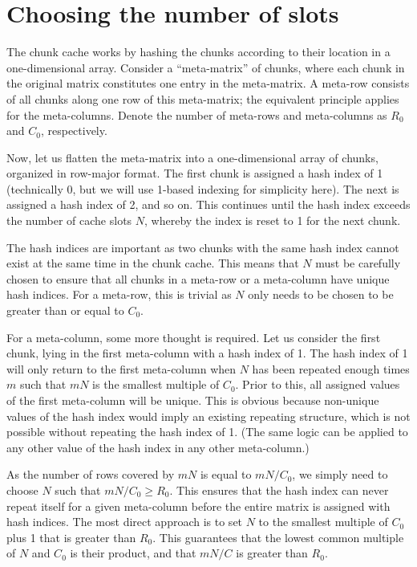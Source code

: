 \documentclass{article}
\begin{document}
\section*{Choosing the number of slots}
The chunk cache works by hashing the chunks according to their location in a one-dimensional array.
Consider a ``meta-matrix'' of chunks, where each chunk in the original matrix constitutes one entry in the meta-matrix.
A meta-row consists of all chunks along one row of this meta-matrix; the equivalent principle applies for the meta-columns.
Denote the number of meta-rows and meta-columns as $R_0$ and $C_0$, respectively.

Now, let us flatten the meta-matrix into a one-dimensional array of chunks, organized in row-major format.
The first chunk is assigned a hash index of 1 (technically 0, but we will use 1-based indexing for simplicity here).
The next is assigned a hash index of 2, and so on.
This continues until the hash index exceeds the number of cache slots $N$,  whereby the index is reset to 1 for the next chunk.

The hash indices are important as two chunks with the same hash index cannot exist at the same time in the chunk cache.
This means that $N$ must be carefully chosen to ensure that all chunks in a meta-row or a meta-column have unique hash indices.
For a meta-row, this is trivial as $N$ only needs to be chosen to be greater than or equal to $C_0$.

For a meta-column, some more thought is required.
Let us consider the first chunk, lying in the first meta-column with a hash index of 1.
The hash index of 1 will only return to the first meta-column when $N$ has been repeated enough times $m$ such that $mN$ is the smallest multiple of $C_0$.
Prior to this, all assigned values of the first meta-column will be unique.
This is obvious because non-unique values of the hash index would imply an existing repeating structure, which is not possible without repeating the hash index of 1.
(The same logic can be applied to any other value of the hash index in any other meta-column.)

As the number of rows covered by $mN$ is equal to $mN/C_0$, we simply need to choose $N$ such that $mN/C_0 \ge R_0$.
This ensures that the hash index can never repeat itself for a given meta-column before the entire matrix is assigned with hash indices.
The most direct approach is to set $N$ to the smallest multiple of $C_0$ plus 1 that is greater than $R_0$.
This guarantees that the lowest common multiple of $N$ and $C_0$ is their product, and that $mN/C$ is greater than $R_0$.
\end{document}
